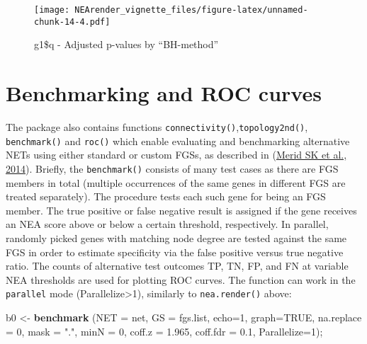 \documentclass[]{article}
\newenvironment{Shaded}{\begin{snugshade}}{\end{snugshade}}
\newcommand{\KeywordTok}[1]{\textcolor[rgb]{0.13,0.29,0.53}{\textbf{#1}}}
\newcommand{\DataTypeTok}[1]{\textcolor[rgb]{0.13,0.29,0.53}{#1}}
\newcommand{\DecValTok}[1]{\textcolor[rgb]{0.00,0.00,0.81}{#1}}
\newcommand{\FloatTok}[1]{\textcolor[rgb]{0.00,0.00,0.81}{#1}}
\newcommand{\StringTok}[1]{\textcolor[rgb]{0.31,0.60,0.02}{#1}}
\newcommand{\OtherTok}[1]{\textcolor[rgb]{0.56,0.35,0.01}{#1}}
\newcommand{\NormalTok}[1]{#1}
\begin{document}
\begin{figure}
\centering
\texttt{[image: NEArender\_vignette\_files/figure-latex/unnamed-chunk-14-4.pdf]}
\caption{g1\$q - Adjusted p-values by ``BH-method''}
\end{figure}

\hypertarget{bor}{\section{Benchmarking and ROC curves}\label{bor}}

The package also contains functions
\texttt{connectivity()},\texttt{topology2nd()}, \texttt{benchmark()} and
\texttt{roc()} which enable evaluating and benchmarking alternative NETs
using either standard or custom FGSs, as described in
(\href{http://www.ncbi.nlm.nih.gov/pubmed/25236784}{Merid SK et al.,
2014}). Briefly, the \texttt{benchmark()} consists of many test cases as
there are FGS members in total (multiple occurrences of the same genes
in different FGS are treated separately). The procedure tests each such
gene for being an FGS member. The true positive or false negative result
is assigned if the gene receives an NEA score above or below a certain
threshold, respectively. In parallel, randomly picked genes with
matching node degree are tested against the same FGS in order to
estimate specificity via the false positive versus true negative ratio.
The counts of alternative test outcomes TP, TN, FP, and FN at variable
NEA thresholds are used for plotting ROC curves. The function can work
in the \texttt{parallel} mode (Parallelize\textgreater{}1), similarly to
\texttt{nea.render()} above:

\begin{Shaded}
\begin{Highlighting}[]
\NormalTok{b0 <-}\StringTok{ }\KeywordTok{benchmark}\NormalTok{ (}\DataTypeTok{NET =}\NormalTok{ net,}
 \DataTypeTok{GS =}\NormalTok{ fgs.list, }
 \DataTypeTok{echo=}\DecValTok{1}\NormalTok{, }\DataTypeTok{graph=}\OtherTok{TRUE}\NormalTok{, }\DataTypeTok{na.replace =} \DecValTok{0}\NormalTok{, }\DataTypeTok{mask =} \StringTok{"."}\NormalTok{, }\DataTypeTok{minN =} \DecValTok{0}\NormalTok{,}
 \DataTypeTok{coff.z =} \FloatTok{1.965}\NormalTok{, }\DataTypeTok{coff.fdr =} \FloatTok{0.1}\NormalTok{, }\DataTypeTok{Parallelize=}\DecValTok{1}\NormalTok{);}
\end{Highlighting}
\end{Shaded}
\end{document}
